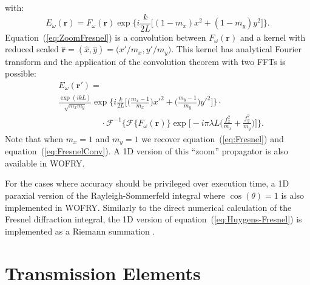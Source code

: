 \documentclass{iucr}              %
\begin{document}
with:
\begin{equation}\label{eq:E}
E_\omega(\textbf{r}) = F_\omega(\textbf{r}) \exp{\bigg\{i \frac{k}{2 L}\big[(1-m_x)x^2+(1-m_y)y^2 \big]\bigg\}}.
\end{equation}
Equation~(\ref{eq:ZoomFresnel}) is a convolution between $F_\omega(\textbf{r})$ and a kernel with reduced scaled $\hat{\textbf{r}}=(\hat{x},\hat{y})=\big(x'\big/m_x, y'\big/m_y\big)$. This kernel has analytical Fourier transform and the application of the convolution theorem with two FFTs is possible:
\begin{equation}\label{eq:ZoomFresnelConv}
\begin{split}
&E_\omega(\textbf{r}') =\\
&\frac{\exp{(ikL)}}{\sqrt{m_xm_y}}\exp{\bigg\{i\frac{k}{2L}\bigg[\bigg(\frac{m_x-1}{m_x}\bigg)x'^2 +\bigg(\frac{m_y-1}{m_y}\bigg)y'^2\bigg]\bigg\}}\cdot\\
&\qquad\qquad\quad\cdot\mathcal{F}^{-1}\bigg\{\mathcal{F}\{F_\omega(\textbf{r})\}\exp\bigg[-i\pi\lambda L\bigg(\frac{f_x^2}{m_x} +\frac{f_y^2}{m_y}\bigg)\bigg]\bigg\}.
\end{split}
\end{equation}
Note that when $m_x=1$ and $m_y=1$ we recover equation~(\ref{eq:Fresnel}) and equation~(\ref{eq:FresnelConv}). A 1D version of this ``zoom'' propagator is also available in WOFRY.

For the cases where accuracy should be privileged over execution time, a 1D paraxial version of the Rayleigh-Sommerfeld integral where $\cos(\theta)=1$ is also implemented in WOFRY. Similarly to the direct numerical calculation of the Fresnel diffraction integral, the 1D version of equation~(\ref{eq:Huygens-Fresnel}) is implemented as a Riemann summation \cite{srioLBL}. 


\section{Transmission Elements}
\label{sec:appendixTransmissionElements}
\end{document}
